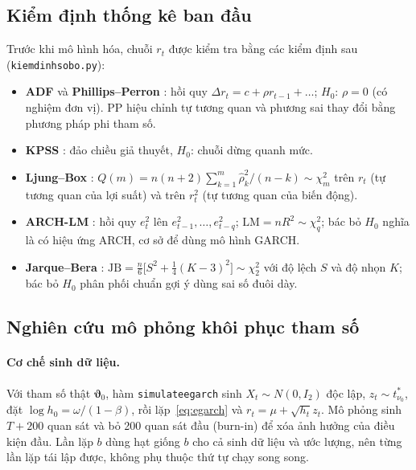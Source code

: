 \documentclass[11pt,a4paper]{article}
\renewcommand{\_}{\gachduoi\allowbreak}
\newcommand{\tep}[1]{\texttt{#1}}
\newcommand{\ham}[1]{\texttt{#1}}
\newcommand{\btheta}{\boldsymbol\vartheta}
\begin{document}
\subsection{Kiểm định thống kê ban đầu}
Trước khi mô hình hóa, chuỗi $r_t$ được kiểm tra bằng các kiểm định sau (\tep{kiem\_dinh\_so\_bo.py}):
\begin{itemize}
\item \textbf{ADF} \cite{dickeyfuller1979} và \textbf{Phillips–Perron} \cite{phillipsperron1988}: hồi quy $\Delta r_t=c+\rho r_{t-1}+\dots$; $H_0$: $\rho=0$ (có nghiệm đơn vị). PP hiệu chỉnh tự tương quan và phương sai thay đổi bằng phương pháp phi tham số.
\item \textbf{KPSS} \cite{kpss1992}: đảo chiều giả thuyết, $H_0$: chuỗi dừng quanh mức.
\item \textbf{Ljung–Box} \cite{ljungbox1978}: $Q(m)=n(n+2)\sum_{k=1}^m\hat\rho_k^2/(n-k)\sim\chi^2_m$ trên $r_t$ (tự tương quan của lợi suất) và trên $r_t^2$ (tự tương quan của biến động).
\item \textbf{ARCH-LM} \cite{engle1982}: hồi quy $e_t^2$ lên $e_{t-1}^2,\dots,e_{t-q}^2$; $\mathrm{LM}=nR^2\sim\chi^2_q$; bác bỏ $H_0$ nghĩa là có hiệu ứng ARCH, cơ sở để dùng mô hình GARCH.
\item \textbf{Jarque–Bera} \cite{jarquebera1980}: $\mathrm{JB}=\frac n6\bigl[S^2+\frac14(K-3)^2\bigr]\sim\chi^2_2$ với độ lệch $S$ và độ nhọn $K$; bác bỏ $H_0$ phân phối chuẩn gợi ý dùng sai số đuôi dày.
\end{itemize}

\subsection{Nghiên cứu mô phỏng khôi phục tham số}\label{sec:mo-phong}
\paragraph{Cơ chế sinh dữ liệu.} Với tham số thật $\btheta_0$, hàm \ham{simulate\_egarch} sinh $X_t\sim N(0,I_2)$ độc lập, $z_t\sim t^*_{\nu_0}$, đặt $\log h_0=\omega/(1-\beta)$, rồi lặp~\eqref{eq:egarch} và $r_t=\mu+\sqrt{h_t}z_t$. Mô phỏng sinh $T+200$ quan sát và bỏ 200 quan sát đầu (burn-in) để xóa ảnh hưởng của điều kiện đầu. Lần lặp $b$ dùng hạt giống $b$ cho cả sinh dữ liệu và ước lượng, nên từng lần lặp tái lập được, không phụ thuộc thứ tự chạy song song.
\end{document}
